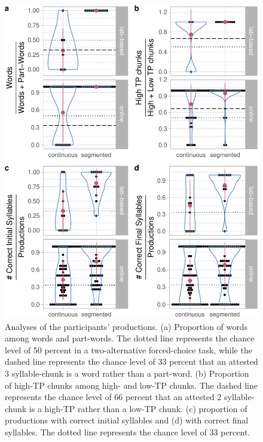 \documentclass[
]{article}
\begin{document}
\begin{figure}

{\centering \includegraphics[width=0.8\linewidth]{segmentation_recall_combined_for_revision3_files/figure-latex/recall-w-pw-chunks-positions-plot-1} 

}

\caption{Analyses of the participants' productions. (a) Proportion of words among words and part-words. The dotted line represents the chance level of 50 percent in a two-alternative forced-choice task, while the dashed line represents the chance level of 33 percent that an attested 3 syllable-chunk is a word rather than a part-word. (b) Proportion of high-TP chunks among high- and low-TP chunks. The dashed line represents the chance level of 66 percent that an attested 2 syllable-chunk is a high-TP rather than a low-TP chunk. (c) proportion of productions with correct initial syllables and (d) with correct final syllables. The dotted line represents the chance level of 33 percent.}\label{fig:recall-w-pw-chunks-positions-plot}
\end{figure}
\end{document}
